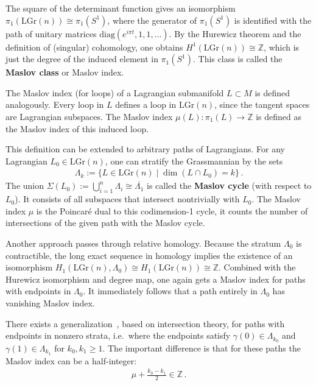     \begin{property}
        The square of the determinant function gives an isomorphism $\pi_1(\mathrm{LGr}(n))\cong\pi_1(S^1)$, where the generator of $\pi_1(S^1)$ is identified with the path of unitary matrices $\mathrm{diag}(e^{i\pi t},1,1,\ldots)$. By the Hurewicz theorem and the definition of (singular) cohomology, one obtains $H^1(\mathrm{LGr}(n))\cong\mathbb{Z}$, which is just the degree of the induced element in $\pi_1(S^1)$. This class is called the \textbf{Maslov class} or Maslov index.

        The Maslov index (for loops) of a Lagrangian submanifold $L\subset M$ is defined analogously. Every loop in $L$ defines a loop in $\mathrm{LGr}(n)$, since the tangent spaces are Lagrangian subspaces. The Maslov index $\mu(L):\pi_1(L)\rightarrow\mathbb{Z}$ is defined as the Maslov index of this induced loop.

        This definition can be extended to arbitrary paths of Lagrangians. For any Lagrangian $L_0\in\mathrm{LGr}(n)$, one can stratify the Grassmannian by the sets
        \begin{gather}
            \Lambda_k := \{L\in\mathrm{LGr}(n)\mid\dim(L\cap L_0) = k\}\,.
        \end{gather}
        The union $\Sigma(L_0):=\bigcup_{i=1}^n\Lambda_i\cong\overline{\Lambda_1}$ is called the \textbf{Maslov cycle} (with respect to $L_0$). It consists of all subspaces that intersect nontrivially with $L_0$. The Maslov index $\mu$ is the Poincar\'e dual to this codimension-1 cycle, it counts the number of intersections of the given path with the Maslov cycle.

        Another approach passes through relative homology. Because the stratum $\Lambda_0$ is contractible, the long exact sequence in homology implies the existence of an isomorphism $H_1(\mathrm{LGr}(n),\Lambda_0)\cong H_1(\mathrm{LGr}(n))\cong\mathbb{Z}$. Combined with the Hurewicz isomorphism and degree map, one again gets a Maslov index for paths with endpoints in $\Lambda_0$. It immediately follows that a path entirely in $\Lambda_0$ has vanishing Maslov index.
    \end{property}
    \begin{remark}
        There exists a generalization~\citep{robbin_maslov_1993}, based on intersection theory, for paths with endpoints in nonzero strata, i.e.~where the endpoints satisfy $\gamma(0)\in\Lambda_{k_0}$ and $\gamma(1)\in\Lambda_{k_1}$ for $k_0,k_1\geq1$. The important difference is that for these paths the Maslov index can be a half-integer:
        \begin{gather}
            \mu + \frac{k_0-k_1}{2}\in\mathbb{Z}\,.
        \end{gather}
    \end{remark}

